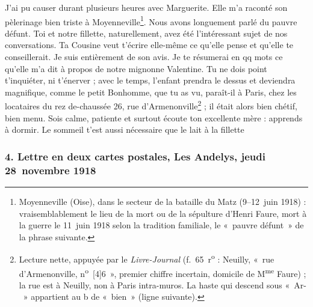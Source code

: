 \begin{LJlettre}
J'ai pu causer durant plusieurs heures avec Marguerite. Elle m'a raconté son pèlerinage bien triste à Moyenneville\footnote{Moyenneville (Oise), dans le secteur de la bataille du Matz (9--12~juin 1918) : vraisemblablement le lieu de la mort ou de la sépulture d'Henri Faure, mort à la guerre le 11~juin 1918 selon la tradition familiale, le «~pauvre défunt~» de la phrase suivante.}. Nous avons longuement parlé du pauvre défunt. Toi et notre fillette, naturellement, avez été l'intéressant sujet de nos conversations. Ta Cousine veut t'écrire elle-même ce qu'elle pense et qu'elle te conseillerait. Je suis entièrement de son avis. Je te résumerai en qq mots ce qu'elle m'a dit à propos de notre mignonne Valentine. Tu ne dois point t'inquiéter, ni t'énerver ; avec le temps, l'enfant prendra le dessus et deviendra magnifique, comme le petit Bonhomme, que tu as vu, paraît-il à Paris, chez les locataires du rez de-chaussée 26, rue d'Armenonville\footnote{Lecture nette, appuyée par le \textit{Livre-Journal} (f.~65~r\textsuperscript{o} : Neuilly, «~rue d'Armenonville, n\textsuperscript{o}~[4]6~», premier chiffre incertain, domicile de M\textsuperscript{me} Faure) ; la rue est à Neuilly, non à Paris intra-muros. La haste qui descend sous «~Ar-~» appartient au b de «~bien~» (ligne suivante).} ; il était alors bien chétif, bien menu. Sois calme, patiente et surtout écoute ton excellente mère : apprends à dormir. Le sommeil t'est aussi nécessaire que le lait à la fillette
\end{LJlettre}

\subsubsection*{4. Lettre en deux cartes postales, Les Andelys, jeudi 28~novembre 1918}

